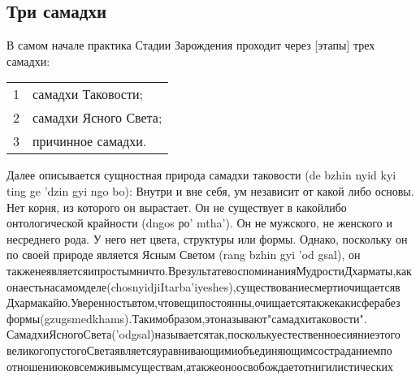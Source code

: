 \subsection{Три самадхи}
\vspace{1cm}
В самом начале практика Стадии Зарождения проходит через [этапы] трех самадхи:

\begin{tabular}{ll}
1 & самадхи Таковости;\\
2 & самадхи Ясного Света;\\
3 & причинное самадхи.\\
\end{tabular}

Далее описывается сущностная природа самадхи таковости (de bzhin nyid kyi ting ge 'dzin
gyi ngo bo): Внутри и вне себя, ум независит от какой либо основы. Нет корня, из которого
он вырастает. Он не существует в какойлибо онтологической крайности (dngos ро' mtha'). Он
не мужского, не женского и несреднего рода. У него нет цвета, структуры или формы.
Однако, поскольку он по своей природе является Ясным Светом (rang bzhin gyi 'od gsal), он
такженеявляетсяипростымничто.ВрезультатевоспоминанияМудростиДхарматы,как
онаестьнасамомделе(chosnyidjiItarba'iyeshes),существованиесмертиочищаетсяв
Дхармакайю.Уверенностьвтом,чтовещипостоянны,очищаетсятакжекакисферабез
формы(gzugsmedkhams).Такимобразом,этоназывают"самадхитаковости".
СамадхиЯсногоСвета('odgsal)называетсятак,посколькуестественноесияниеэтого
великогопустогоСветаявляетсяуравнивающимиобъединяющимсостраданиемпо
отношениюковсемживымсуществам,атакжеоноосвобождаетотнигилистических
